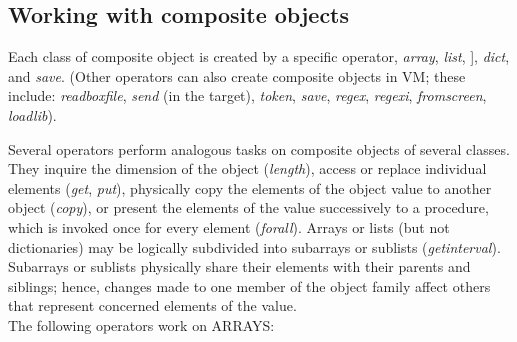 \subsection{Working with composite objects}

Each class of composite object is created by a specific operator,
\emph{array}, \emph{list}, ], \emph{dict}, and \emph{save}. (Other
operators can also create composite objects in VM; these include:
\emph{readboxfile}, \emph{send} (in the target), \emph{token},
\emph{save}, \emph{regex}, \emph{regexi}, \emph{fromscreen},
\emph{loadlib}).

Several  operators  perform  analogous  tasks  on  composite  objects  of several classes. They inquire the dimension of the object (\emph{length}), access or replace individual elements (\emph{get}, \emph{put}), physically copy the elements of the object value to another object (\emph{copy}),  or present the elements of  the value successively to a procedure, which is invoked once for every element (\emph{forall}).  Arrays  or  lists  (but  not  dictionaries)  may  be  logically subdivided into subarrays or sublists (\emph{getinterval}). Subarrays or sublists physically  share their elements with their parents and  siblings;  hence, changes  made  to  one  member of the object  family  affect  others  that represent  concerned elements of the value.\\

\noindent The following operators work on ARRAYS:

